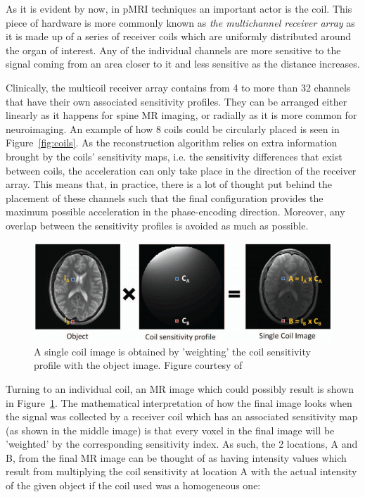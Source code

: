 As it is evident by now, in pMRI techniques an important actor is the coil. This piece of hardware is more commonly known as \textit{the multichannel receiver array} as it is made up of a series of receiver coils which are uniformly distributed around the organ of interest. Any of the individual channels are more sensitive to the signal coming from an area closer to it and less sensitive as the distance increases.

Clinically, the multicoil receiver array contains from 4 to more than 32 channels that have their own associated sensitivity profiles. They can be arranged either linearly as it happens for spine MR imaging, or radially as it is more common for neuroimaging. An example of how 8 coils could be circularly placed is seen in Figure~\ref{fig:coils}. As the reconstruction algorithm relies on extra information brought by the coils' sensitivity maps, i.e. the sensitivity differences that exist between coils, the acceleration can only take place in the direction of the receiver array. This means that, in practice, there is a lot of thought put behind the placement of these channels such that the final configuration provides the maximum possible acceleration in the phase-encoding direction. Moreover, any overlap between the sensitivity profiles is avoided as much as possible.

\begin{figure}[ht]
    \centering
    \includegraphics[width=\textwidth,keepaspectratio]{onecoilsens}
    \caption{A single coil image is obtained by 'weighting' the coil sensitivity profile with the object image. Figure courtesy of \cite{Deshmane2012}}
    \label{fig:onecoilsens}
\end{figure}

Turning to an individual coil, an MR image which could possibly result is shown in Figure~\ref{fig:onecoilsens}. The mathematical interpretation of how the final image looks when the signal was collected by a receiver coil which has an associated sensitivity map (as shown in the middle image) is that every voxel in the final image will be 'weighted' by the corresponding sensitivity index. As such, the 2 locations, A and B, from the final MR image can be thought of as having intensity values which result from multiplying the coil sensitivity at location A with the actual intensity of the given object if the coil used was a homogeneous one:

